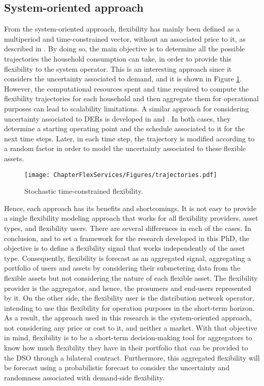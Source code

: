 \subsection{System-oriented approach}
From the system-oriented approach, flexibility has mainly been defined as a multiperiod and time-constrained vector, without an associated price to it, as described in \cite{Pinto2017}. By doing so, the main objective is to determine all the possible trajectories the household consumption can take, in order to provide this flexibility to the system operator. This is an interesting approach since it considers the uncertainty associated to demand, and it is shown in Figure \ref{fig:system}. However, the computational resources spent and time required to compute the flexibility trajectories for each household and then aggregate them for operational purposes can lead to scalability limitations. A similar approach for considering uncertainty associated to DERs is developed in \cite{Bremer2013} and \cite{SONNENSCHEIN2015}. In both cases, they determine a starting operating point and the schedule associated to it for the next time steps. Later, in each time step, the trajectory is modified according to a random factor in order to model the uncertainty associated to these flexible assets. 

\begin{figure}[htbp]
	\centering
	\texttt{[image: ChapterFlexServices/Figures/trajectories.pdf]}
		\caption{Stochastic time-constrained flexibility.}
	\label{fig:system}  
\end{figure}

Hence, each approach has its benefits and shortcomings. It is not easy to provide a single flexibility modeling approach that works for all flexibility providers, asset types, and flexibility users. There are several differences in each of the cases. In conclusion, and to set a framework for the research developed in this PhD, the objective is to define a flexibility signal that works independently of the asset type. Consequently, flexibility is forecast as an aggregated signal, aggregating a portfolio of users and assets by considering their submetering data from the flexible assets but not considering the nature of each flexible asset. 
The flexibility provider is the aggregator, and hence, the prosumers and end-users represented by it. On the other side, the flexibility user is the distribution network operator, intending to use this flexibility for operation purposes in the short-term horizon. As a result, the approach used in this research is the system-oriented approach, not considering any price or cost to it, and neither a market. With that objective in mind, flexibility is to be a short-term decision-making tool for aggregators to know how much flexibility they have in their portfolio that can be provided to the DSO through a bilateral contract. Furthermore, this aggregated flexibility will be forecast using a probabilistic forecast to consider the uncertainty and randomness associated with demand-side flexibility. 

